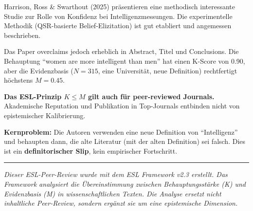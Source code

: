\begin{principlebox}[Fazit]
Harrison, Ross \& Swarthout (2025) pr\"asentieren eine methodisch interessante Studie zur Rolle von Konfidenz bei Intelligenzmessungen. Die experimentelle Methodik (QSR-basierte Belief-Elizitation) ist gut etabliert und angemessen beschrieben.

Das Paper overclaims jedoch erheblich in Abstract, Titel und Conclusions. Die Behauptung ``women are more intelligent than men'' hat einen K-Score von 0.90, aber die Evidenzbasis ($N=315$, eine Universit\"at, neue Definition) rechtfertigt h\"ochstens $M=0.45$.

\textbf{Das ESL-Prinzip $K \leq M$ gilt auch f\"ur peer-reviewed Journals.} Akademische Reputation und Publikation in Top-Journals entbinden nicht von epistemischer Kalibrierung.

\textbf{Kernproblem:} Die Autoren verwenden eine neue Definition von ``Intelligenz'' und behaupten dann, die alte Literatur (mit der alten Definition) sei falsch. Dies ist ein \textbf{definitorischer Slip}, kein empirischer Fortschritt.
\end{principlebox}

\vspace{1em}
\noindent\rule{\textwidth}{0.5pt}
\small
\emph{Dieser ESL-Peer-Review wurde mit dem ESL Framework v2.3 erstellt. Das Framework analysiert die \"Ubereinstimmung zwischen Behauptungsst\"arke (K) und Evidenzbasis (M) in wissenschaftlichen Texten. Die Analyse ersetzt nicht inhaltliche Peer-Review, sondern erg\"anzt sie um eine epistemische Dimension.}
